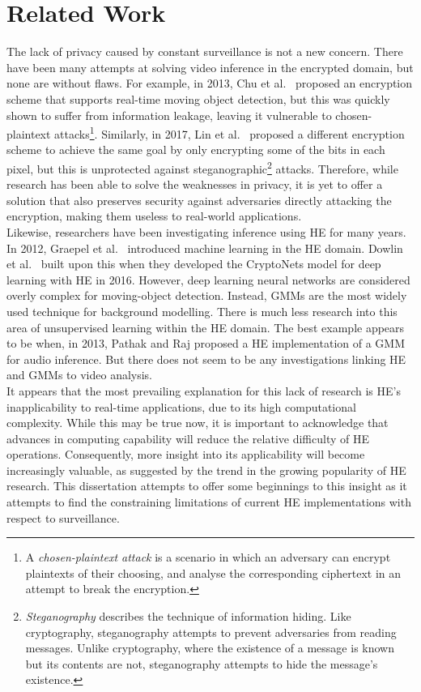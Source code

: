 \section{Related Work}
\label{sec:relatedWork}
\setlength{\leftskip}{0.5cm}
\indent \indent
The lack of privacy caused by constant surveillance is not a new concern. There have been many attempts at solving video inference in the encrypted domain, but none are without flaws. For example, in 2013, Chu et al.\ \cite{Chu} proposed an encryption scheme that supports real-time moving object detection, but this was quickly shown to suffer from information leakage, leaving it vulnerable to chosen-plaintext attacks\footnote{ A \textit{chosen-plaintext attack} is a scenario in which an adversary can encrypt plaintexts of their choosing, and analyse the corresponding ciphertext in an attempt to break the encryption. }. Similarly, in 2017, Lin et al.\ \cite{Lin} proposed a different encryption scheme to achieve the same goal by only encrypting some of the bits in each pixel, but this is unprotected against steganographic\footnote{\textit{Steganography} describes the technique of information hiding. Like cryptography, steganography attempts to prevent adversaries from reading messages. Unlike cryptography, where the existence of a message is known but its contents are not, steganography attempts to hide the message's existence.} attacks. Therefore, while research has been able to solve the weaknesses in privacy, it is yet to offer a solution that also preserves security against adversaries directly attacking the encryption, making them useless to real-world applications.
\smallskip \\ \indent
Likewise, researchers have been investigating inference using HE for many years. In 2012, Graepel et al.\ \cite{Graepel} introduced machine learning in the HE domain. Dowlin et al.\ \cite{Graepel} built upon this when they developed the CryptoNets model for deep learning with HE in 2016. However, deep learning neural networks are considered overly complex for moving-object detection. Instead, GMMs are the most widely used technique for background modelling. There is much less research into this area of unsupervised learning within the HE domain. The best example appears to be when, in 2013, Pathak and Raj \cite{Pathak} proposed a HE implementation of a GMM for audio inference. But there does not seem to be any investigations linking HE and GMMs to video analysis.
\smallskip \\ \indent
It appears that the most prevailing explanation for this lack of research is HE's inapplicability to real-time applications, due to its high computational complexity. While this may be true now, it is important to acknowledge that advances in computing capability will reduce the relative difficulty of HE operations. Consequently, more insight into its applicability will become increasingly valuable, as suggested by the trend in the growing popularity of HE research. This dissertation attempts to offer some beginnings to this insight as it attempts to find the constraining limitations of current HE implementations with respect to surveillance.

